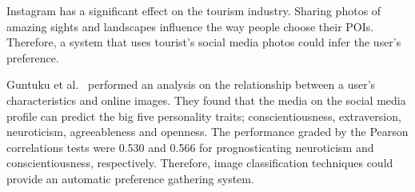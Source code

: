Instagram has a significant effect on the tourism
industry. Sharing photos of amazing sights and
landscapes influence the way people choose their
POIs\cite{Terttunen2017}. Therefore, a system that
uses tourist's social media photos could infer the
user's preference.

Guntuku et al.~\cite{Guntuku2017} performed an
analysis on the relationship between a user's
characteristics and online images. They found that the
media on the social media profile can predict the big
five personality traits; conscientiousness,
extraversion, neuroticism, agreeableness and openness.
The performance graded by the Pearson correlations
tests were 0.530 and 0.566 for prognosticating
neuroticism and conscientiousness, respectively. 
Therefore, image classification
techniques could provide an automatic preference
gathering system.

